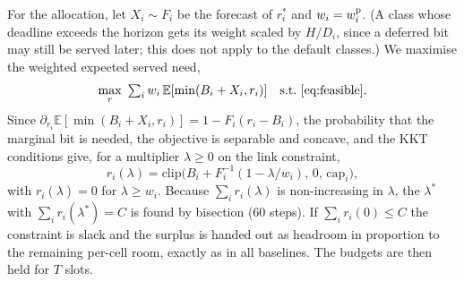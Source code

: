 \documentclass[conference]{IEEEtran}
\begin{document}
For the allocation, let $X_i \sim F_i$ be the forecast of $r^\ast_i$ and $w_i = w_i^{\rm p}$. (A class whose deadline exceeds the horizon gets its weight scaled by $H/D_i$, since a deferred bit may still be served later; this does not apply to the default classes.) We maximise the weighted expected served need,
\begin{equation}
\max_{r}\ \textstyle\sum_i w_i\, \mathbb{E}[\min(B_i + X_i, r_i)] \quad \text{s.t.\ } \eqref{eq:feasible}.
\label{eq:obj}
\end{equation}
Since $\partial_{r_i}\mathbb{E}[\min(B_i + X_i, r_i)] = 1 - F_i(r_i - B_i)$, the probability that the marginal bit is needed, the objective is separable and concave, and the KKT conditions give, for a multiplier $\lambda \ge 0$ on the link constraint,
\begin{equation}
r_i(\lambda) = \mathrm{clip}\big( B_i + F_i^{-1}(1 - \lambda/w_i),\, 0,\, \mathrm{cap}_i \big),
\label{eq:kkt}
\end{equation}
with $r_i(\lambda) = 0$ for $\lambda \ge w_i$. Because $\sum_i r_i(\lambda)$ is non-increasing in $\lambda$, the $\lambda^\ast$ with $\sum_i r_i(\lambda^\ast) = C$ is found by bisection (60 steps). If $\sum_i r_i(0) \le C$ the constraint is slack and the surplus is handed out as headroom in proportion to the remaining per-cell room, exactly as in all baselines. The budgets are then held for $T$ slots.
\end{document}
